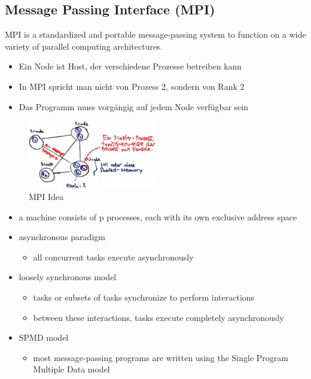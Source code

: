 \clearpage
\hypertarget{message-passing-interface-mpi}{%
\subsection{Message Passing Interface
(MPI)}\label{message-passing-interface-mpi}}

MPI is a standardized and portable message-passing system to function on
a wide variety of parallel computing architectures.

\begin{itemize}
\tightlist
\item
  Ein Node ist Host, der verschiedene Prozesse betreiben kann
\item
  In MPI spricht man nicht von Prozess 2, sondern von Rank 2
\item
  Das Programm muss vorgängig auf jedem Node verfügbar sein
\end{itemize}

\begin{figure}[H]
\centering
\includegraphics[width=0.5\textwidth]{figures/mpi_idea.png}
\caption{MPI Idea}
\end{figure}

\begin{itemize}
\tightlist
\item
  a machine consists of p processes, each with its own exclusive address
  space
\item
  asynchronous paradigm

  \begin{itemize}
  \tightlist
  \item
    all concurrent tasks execute asynchronously
  \end{itemize}
\item
  loosely synchronous model

  \begin{itemize}
  \tightlist
  \item
    tasks or subsets of tasks synchronize to perform interactions
  \item
    between these interactions, tasks execute completely asynchronously
  \end{itemize}
\item
  SPMD model

  \begin{itemize}
  \tightlist
  \item
    most message-passing programs are written using the Single Program
    Multiple Data model
  \end{itemize}
\end{itemize}

